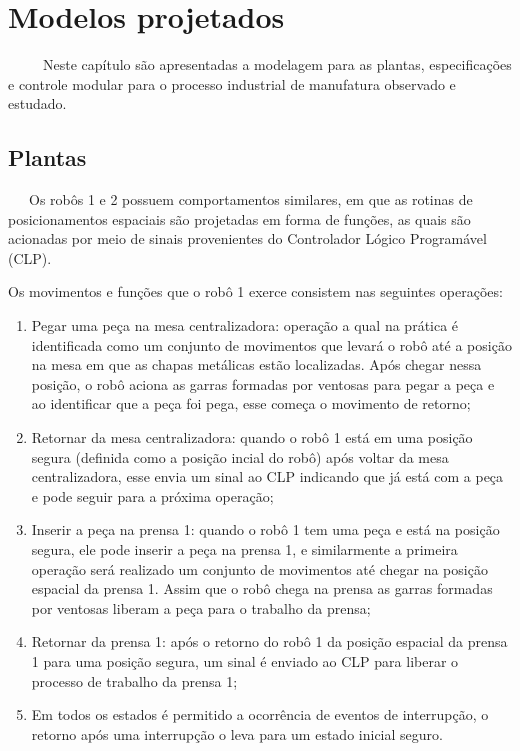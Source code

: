 \section{Modelos projetados}

~~~~~Neste capítulo são apresentadas a modelagem para as plantas, especificações e controle modular para o processo industrial de manufatura observado e estudado.

\subsection{Plantas}

~~~Os robôs 1 e 2 possuem comportamentos similares, em que as rotinas de posicionamentos espaciais são projetadas em forma de funções, as quais são acionadas por meio de sinais provenientes do Controlador Lógico Programável (CLP). 

Os movimentos e funções que o robô 1 exerce consistem nas seguintes operações:

\begin{enumerate}
	\item Pegar uma peça na mesa centralizadora: operação a qual na prática é identificada como um conjunto de movimentos que levará o robô até a posição na mesa em que as chapas metálicas estão localizadas. Após chegar nessa posição, o robô aciona as garras formadas por ventosas para pegar a peça e ao identificar que a peça foi pega, esse começa o movimento de retorno;
	
	\item Retornar da mesa centralizadora: quando o robô 1 está em uma posição segura (definida como a posição incial do robô) após voltar da mesa centralizadora, esse envia um sinal ao CLP indicando que já está com a peça e pode seguir para a próxima operação;
	
	\item Inserir a peça na prensa 1: quando o robô 1 tem uma peça e está na posição segura, ele pode inserir a peça na prensa 1, e similarmente a primeira operação será realizado um conjunto de movimentos até chegar na posição espacial da prensa 1. Assim que o robô chega na prensa as garras formadas por ventosas liberam a peça para o trabalho da prensa;
	
	\item Retornar da prensa 1: após o retorno do robô 1 da posição espacial da prensa 1 para uma posição segura, um sinal é enviado ao CLP para liberar o processo de trabalho da prensa 1;
	
	\item Em todos os estados é permitido a ocorrência de eventos de interrupção, o retorno após uma interrupção o leva para um estado inicial seguro.
\end{enumerate}

